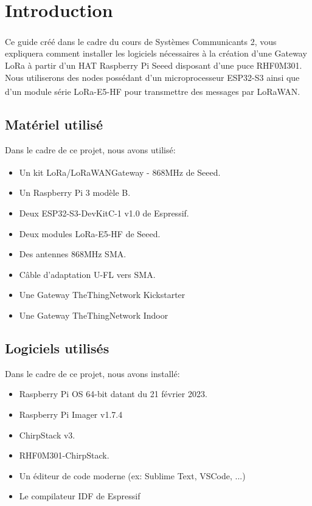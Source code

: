 \documentclass{article}
\begin{document}
	\maketitle
	\newpage
	\tableofcontents
	\newpage
	\section{Introduction}
		Ce guide créé dans le cadre du cours de Systèmes Communicants 2\textsuperscript\textcopyright, vous expliquera comment installer les logiciels nécessaires à la création d'une Gateway LoRa à partir d'un HAT Raspberry Pi Seeed disposant d'une puce RHF0M301.\\
		Nous utiliserons des nodes possédant d'un microprocesseur ESP32-S3 ainsi que d'un module série LoRa-E5-HF pour transmettre des messages par LoRaWAN\textsuperscript\textregistered.
		\subsection{Matériel utilisé}
			Dans le cadre de ce projet, nous avons utilisé:
			\begin{itemize}
				\item Un kit LoRa/LoRaWAN\textsuperscript\textregistered Gateway - 868MHz de Seeed.
				\item Un Raspberry Pi 3 modèle B.
				\item Deux ESP32-S3-DevKitC-1 v1.0 de Espressif.
				\item Deux modules LoRa-E5-HF de Seeed.
				\item Des antennes 868MHz SMA.
				\item Câble d'adaptation U-FL vers SMA.
				\item Une Gateway TheThingNetwork Kickstarter
				\item Une Gateway TheThingNetwork Indoor 
			\end{itemize}
		\subsection{Logiciels utilisés}
			Dans le cadre de ce projet, nous avons installé:
				\begin{itemize}
				\item Raspberry Pi OS 64-bit datant du 21 février 2023.
				\item Raspberry Pi Imager v1.7.4
				\item ChirpStack v3.
				\item RHF0M301-ChirpStack.
				\item Un éditeur de code moderne (ex: Sublime Text, VSCode, ...)
				\item Le compilateur IDF de Espressif
			\end{itemize}
\end{document}
